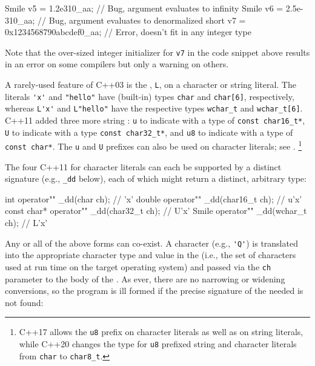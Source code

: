\begin{emcppslisting}[emcppsbatch=e10]
Smile v5 = 1.2e310_aa;              // Bug, argument evaluates to infinity
Smile v6 = 2.5e-310_aa;             // Bug, argument evaluates to denormalized
short v7 = 0x1234568790abcdef0_aa;  // Error, doesn't fit in any integer type
\end{emcppslisting}
    
\noindent Note that the over-sized integer initializer for \lstinline!v7! in the code snippet above
results in an error on some compilers but only a warning on others.

A rarely-used feature of C++03 is the ,
\lstinline!L!, on a character or string literal. The literals \lstinline!'x'!
and \lstinline!"hello"! have (built-in) types \lstinline!char! and
\lstinline!char[6]!, respectively, whereas \lstinline!L'x'! and
\lstinline!L"hello"! have the respective types \lstinline!wchar_t! and
\lstinline!wchar_t[6]!. C++11 added three more string 
: \lstinline!u! to indicate 
with a type of \lstinline!const char16_t*!, \lstinline!U! to indicate  
with a type \lstinline!const char32_t*!, and \lstinline!u8! to indicate 
with a type of \lstinline!const char*!.  The \lstinline!u! and \lstinline!U! prefixes can also
be used on character literals; see  .
{\cprotect\footnote{C++17 allows the \lstinline!u8! prefix on
  character literals as well as on string literals, while C++20 changes the type for
  \lstinline!u8! prefixed string and character literals from \lstinline!char! to \lstinline!char8_t!.}}

The four C++11  for character literals can
each be supported by a distinct  signature (e.g.,
\lstinline!_dd! below), each of which might return a distinct, arbitrary
type:

\begin{emcppslisting}[emcppsbatch=e10]
int         operator"" _dd(char     ch);  //  'x'
double      operator"" _dd(char16_t ch);  // u'x'
const char* operator"" _dd(char32_t ch);  // U'x'
Smile       operator"" _dd(wchar_t  ch);  // L'x'
\end{emcppslisting}
    
\noindent Any or all of the above forms can co-exist. A character  (e.g., \lstinline!'Q'!) is translated into the appropriate
character type and value in the  (i.e.,
the set of characters used at run time on the target operating system)
and passed via the \lstinline!ch! parameter to the body of the . As ever, there are no narrowing or widening conversions, so
the program is ill formed if the precise signature of the needed
 is not found:

